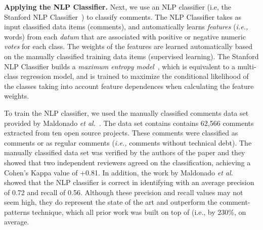 \noindent\textbf{Applying the NLP Classifier.} Next, we use an NLP classifier (i.e, the Stanford NLP Classifier~\cite{Manning2014ACL}) to classify \SATD comments.
The NLP Classifier takes as input classified data items (comments), and automatically learns \textit{features} (\textit{i.e.,} words) from each \textit{datum} that are associated with positive or negative numeric \textit{votes} for each class. The weights of the features are learned automatically based on the manually classified training data items (supervised learning). The Stanford NLP Classifier builds a \textit{maximum entropy model}~\cite{nigam1999using}, which is equivalent to a multi-class regression model, and is trained to maximize the conditional likelihood of the classes taking into account feature dependences when calculating the feature weights.

To train the NLP classifier, we used the manually classified \SATD comments data set provided by Maldonado \emph{et al.}~\cite{Maldonado2015MTD}. The data set contains contains 62,566 comments extracted from ten open source projects. These comments were classified as \SATD comments or as regular comments (\textit{i.e.,} comments without technical debt). The manually classified data set was verified by the authors of the paper and they showed that two independent reviewers agreed on the classification, achieving a Cohen's Kappa value of +0.81. In addition, the work by Maldonado \emph{et al.}~\cite{Maldonado2015TSE} showed that the NLP classifier is correct in identifying \SATD with an average precision of 0.72 and recall of 0.56. Although these precision and recall values may not seem high, they do represent the state of the art and outperform the comment-patterns technique, which all prior work was built on top of (i.e.,  by 230\%, on average. 




